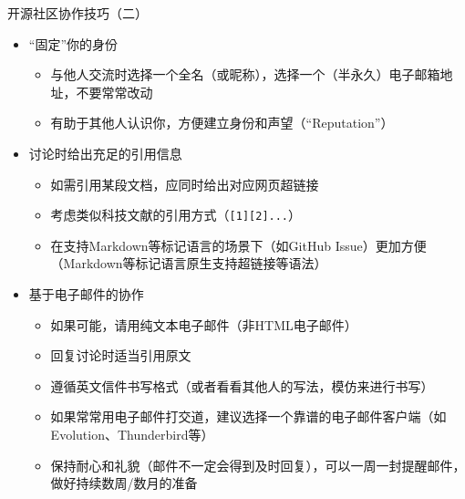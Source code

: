 \begin{frame}{开源社区协作技巧（二）}
	\begin{itemize}
		\item “固定”你的身份
		\begin{itemize}
			\item 与他人交流时选择一个全名（或昵称），选择一个（半永久）电子邮箱地址，不要常常改动
			\item 有助于其他人认识你，方便建立身份和声望（“Reputation”）
		\end{itemize}
		\item 讨论时给出充足的引用信息
		\begin{itemize}
			\item 如需引用某段文档，应同时给出对应网页超链接
			\item 考虑类似科技文献的引用方式（\texttt{[1][2]...}）
			\item 在支持Markdown等标记语言的场景下（如GitHub Issue）更加方便（Markdown等标记语言原生支持超链接等语法）
		\end{itemize}
		\item 基于电子邮件的协作
		\begin{itemize}
			\item 如果可能，请用纯文本电子邮件（非HTML电子邮件）
			\item 回复讨论时适当引用原文
			\item 遵循英文信件书写格式（或者看看其他人的写法，模仿来进行书写）
			\item 如果常常用电子邮件打交道，建议选择一个靠谱的电子邮件客户端（如Evolution、Thunderbird等）
			\item 保持耐心和礼貌（邮件不一定会得到及时回复），可以一周一封提醒邮件，做好持续数周/数月的准备
		\end{itemize}

	\end{itemize}	
\end{frame}